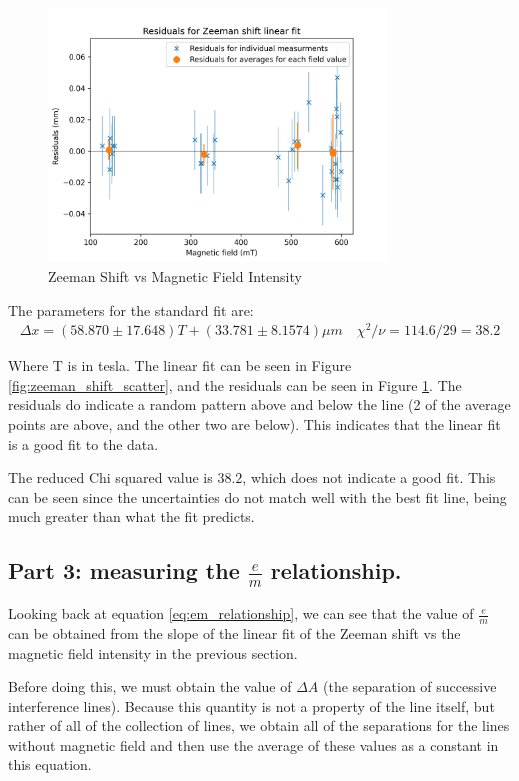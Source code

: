 \begin{figure}
    \centering
    \includegraphics[width=0.8\textwidth]{Results/img/zeeman_shift_residuals.png}
    \caption{Zeeman Shift vs Magnetic Field Intensity}
    \label{fig:zeeman_shift_residuals}
\end{figure}

The parameters for the standard fit are:
\begin{gather*}
    \Delta x = (58.870 \pm 17.648)T + (33.781 \pm 8.1574) \mu m \quad \chi^2 / \nu = 114.6 / 29 = 38.2
\end{gather*}

Where T is in tesla. The linear fit can be seen in Figure \ref{fig:zeeman_shift_scatter}, and the residuals can be seen in Figure \ref{fig:zeeman_shift_residuals}. The residuals do indicate a random
pattern above and below the line (2 of the average points are above, and the other two are below). This indicates that the linear fit is a good fit to the data.

The reduced Chi squared value is $38.2$, which does not indicate a good fit. This can be seen since the uncertainties do not match well with the best fit line, being much greater than what the fit predicts.
\subsection{Part 3: measuring the $\frac{e}{m}$ relationship.}

Looking back at equation \ref{eq:em_relationship}, we can see that the value of $\frac{e}{m}$ can be obtained from the slope of the linear fit of the Zeeman shift vs the magnetic field intensity in the previous section.

Before doing this, we must obtain the value of $\Delta A$ (the separation of successive interference lines). Because this quantity is not a property
of the line itself, but rather of all of the collection of lines, we obtain all of the separations for the lines without magnetic field
and then use the average of these values as a constant in this equation.

